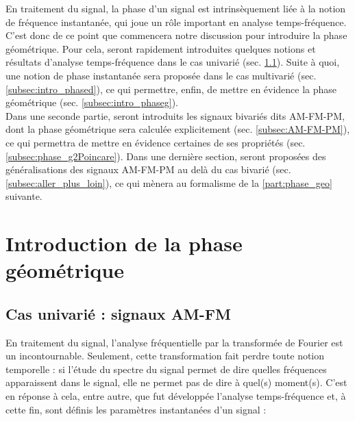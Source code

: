 
En traitement du signal, la phase d'un signal est intrinsèquement liée à la notion de fréquence instantanée, qui joue un rôle important en analyse temps-fréquence. 
C'est donc de ce point que commencera notre discussion pour introduire la phase géométrique.
Pour cela, seront rapidement introduites quelques notions et résultats d'analyse temps-fréquence dans le cas univarié (sec. \ref{subsec:ana_temp-freq}). Suite à quoi, une notion de phase instantanée sera proposée dans le cas multivarié (sec. \ref{subsec:intro_phased}), ce qui permettre, enfin, de mettre en évidence la phase géométrique (sec. \ref{subsec:intro_phaseg}).
\\

Dans une seconde partie, seront introduits les signaux bivariés dits AM-FM-PM, dont la phase géométrique sera calculée explicitement (sec. \ref{subsec:AM-FM-PM}), ce qui permettra de mettre en évidence certaines de ses propriétés (sec. \ref{subsec:phase_g2Poincare}). Dans une dernière section, seront proposées des généralisations des signaux AM-FM-PM au delà du cas bivarié (sec. \ref{subsec:aller_plus_loin}), ce qui mènera au formalisme de la \cref{part:phase_geo} suivante.
\\




\section{Introduction de la phase géométrique} \label{sec:intro_phaseg}

\subsection{Cas univarié : signaux AM-FM} \label{subsec:ana_temp-freq}


En traitement du signal, l'analyse fréquentielle par la transformée de Fourier est un incontournable. 
Seulement, cette transformation fait perdre toute notion temporelle : si l'étude du spectre du signal permet de dire quelles fréquences apparaissent dans le signal, elle ne permet pas de dire à quel(s) moment(s). 
C'est en réponse à cela, entre autre, que fut développée l'analyse temps-fréquence et, à cette fin, sont définis les paramètres instantanées d'un signal :\par

